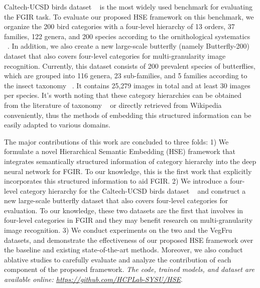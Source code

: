\documentclass[sigconf]{acmart}
\begin{document}
Caltech-UCSD birds dataset ~\cite{wah2011caltech} is the most widely used benchmark for evaluating the FGIR task. To evaluate our proposed HSE framework on this benchmark, we organize the 200 bird categories with a four-level hierarchy of 13 orders, 37 families, 122 genera, and 200 species according to the ornithological systematics ~\cite{salvador2017taxonomy,remsen2016revised}. In addition, we also create a new large-scale butterfly (namely Butterfly-200) dataset that also covers four-level categories for multi-granularity image recognition. Currently, this dataset consists of 200 prevalent species of butterflies, which are grouped into 116 genera, 23 sub-families, and 5 families according to the insect taxonomy ~\cite{verovnik2013annotated,sambhu2018butterflies}. It contains 25,279 images in total and at least 30 images per species. It's worth noting that these category hierarchies can be obtained from the literature of taxonomy ~\cite{salvador2017taxonomy,verovnik2013annotated} or directly retrieved from Wikipedia conveniently, thus the methods of embedding this structured information can be easily adapted to various domains.


The major contributions of this work are concluded to three folds: 1) We formulate a novel Hierarchical Semantic Embedding (HSE) framework that integrates semantically structured information of category hierarchy into the deep neural network for FGIR. To our knowledge, this is the first work that explicitly incorporates this structured information to aid FGIR. 2) We introduce a four-level category hierarchy for the Caltech-UCSD birds dataset ~\cite{wah2011caltech} and construct a new large-scale butterfly dataset that also covers four-level categories for evaluation. To our knowledge, these two datasets are the first that involves in four-level categories in FGIR and they may benefit research on multi-granularity image recognition. 3) We conduct experiments on the two and the VegFru ~\cite{hou2017vegfru} datasets, and demonstrate the effectiveness of our proposed HSE framework over the baseline and existing state-of-the-art methods. Moreover, we also conduct ablative studies to carefully evaluate and analyze the contribution of each component of the proposed framework. \emph{The code, trained models, and dataset are available online: \url{https://github.com/HCPLab-SYSU/HSE}}.


\end{document}

